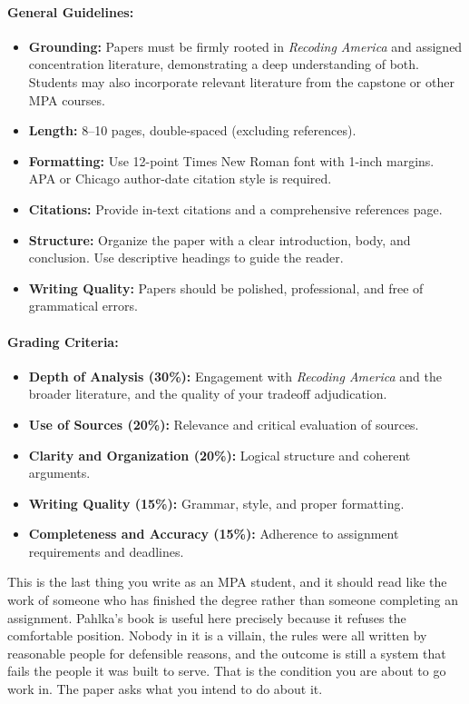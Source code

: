 \documentclass[11pt]{article}     %
\begin{document}
\paragraph*{General Guidelines:}
\begin{itemize}
    \item \textbf{Grounding:} Papers must be firmly rooted in \textit{Recoding America} and assigned concentration literature, demonstrating a deep understanding of both. Students may also incorporate relevant literature from the capstone or other MPA courses.
    \item \textbf{Length:} 8--10 pages, double-spaced (excluding references).
    \item \textbf{Formatting:} Use 12-point Times New Roman font with 1-inch margins. APA or Chicago author-date citation style is required.
    \item \textbf{Citations:} Provide in-text citations and a comprehensive references page.
    \item \textbf{Structure:} Organize the paper with a clear introduction, body, and conclusion. Use descriptive headings to guide the reader.
    \item \textbf{Writing Quality:} Papers should be polished, professional, and free of grammatical errors.
\end{itemize}

\paragraph*{Grading Criteria:}
\begin{itemize}
    \item \textbf{Depth of Analysis (30\%):} Engagement with \textit{Recoding America} and the broader literature, and the quality of your tradeoff adjudication.
    \item \textbf{Use of Sources (20\%):} Relevance and critical evaluation of sources.
    \item \textbf{Clarity and Organization (20\%):} Logical structure and coherent arguments.
    \item \textbf{Writing Quality (15\%):} Grammar, style, and proper formatting.
    \item \textbf{Completeness and Accuracy (15\%):} Adherence to assignment requirements and deadlines.
\end{itemize}
\noindent This is the last thing you write as an MPA student, and it should read like the work of someone who has finished the degree rather than someone completing an assignment. Pahlka's book is useful here precisely because it refuses the comfortable position. Nobody in it is a villain, the rules were all written by reasonable people for defensible reasons, and the outcome is still a system that fails the people it was built to serve. That is the condition you are about to go work in. The paper asks what you intend to do about it.
\end{document}
